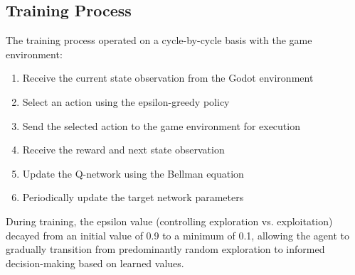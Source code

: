 \subsection{Training Process}

The training process operated on a cycle-by-cycle basis with the game environment:

\begin{enumerate}
    \item Receive the current state observation from the Godot environment
    \item Select an action using the epsilon-greedy policy
    \item Send the selected action to the game environment for execution
    \item Receive the reward and next state observation
    \item Update the Q-network using the Bellman equation
    \item Periodically update the target network parameters
\end{enumerate}

During training, the epsilon value (controlling exploration vs. exploitation) decayed from an initial value of 0.9 to a minimum of 0.1, 
allowing the agent to gradually transition from predominantly random exploration to informed decision-making based on learned values.